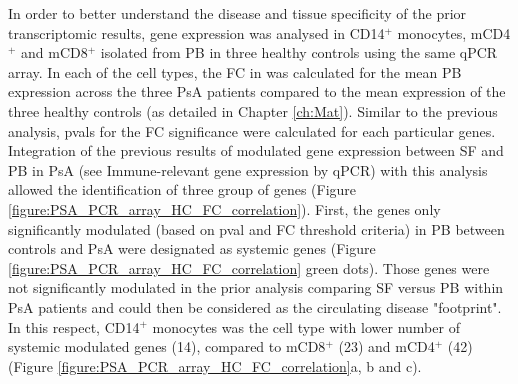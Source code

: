 In order to better understand the disease and tissue specificity of the prior transcriptomic results, gene expression was analysed in CD14$^+$ monocytes, mCD4$^+$ and mCD8$^+$ isolated from PB in three healthy controls using the same qPCR array. In each of the cell types, the FC in was calculated for the mean PB expression across the three PsA patients compared to the mean expression of the three healthy controls (as detailed in Chapter \ref{ch:Mat}). Similar to the previous analysis, pvals for the FC significance were calculated for each particular genes. Integration of the previous results of modulated gene expression between SF and PB in PsA (see Immune-relevant gene expression by qPCR) with this analysis allowed the identification of three group of genes (Figure \ref{figure:PSA_PCR_array_HC_FC_correlation}). First, the genes only significantly modulated (based on pval and FC threshold criteria) in PB between controls and PsA were designated as systemic genes (Figure \ref{figure:PSA_PCR_array_HC_FC_correlation} green dots). Those genes were not significantly modulated in the prior analysis comparing SF versus PB within PsA patients and could then be considered as the circulating disease "footprint". In this respect, CD14$^+$ monocytes was the cell type with lower number of systemic modulated genes (14), compared to mCD8$^+$ (23) and mCD4$^+$ (42) (Figure \ref{figure:PSA_PCR_array_HC_FC_correlation}a, b and c). 


